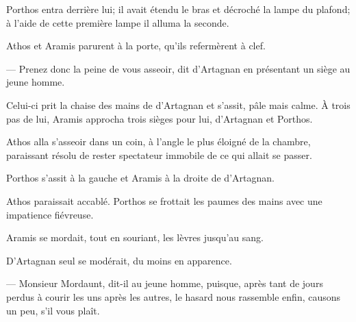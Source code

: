 Porthos entra derrière lui; il avait étendu le bras et décroché la lampe du plafond; à l'aide de cette première lampe il alluma la seconde.

Athos et Aramis parurent à la porte, qu'ils refermèrent à clef.

— Prenez donc la peine de vous asseoir, dit d'Artagnan en présentant un siège au jeune homme.

Celui-ci prit la chaise des mains de d'Artagnan et s'assit, pâle mais calme. À trois pas de lui, Aramis approcha trois sièges pour lui, d'Artagnan et Porthos.

Athos alla s'asseoir dans un coin, à l'angle le plus éloigné de la chambre, paraissant résolu de rester spectateur immobile de ce qui allait se passer.

Porthos s'assit à la gauche et Aramis à la droite de d'Artagnan.

Athos paraissait accablé. Porthos se frottait les paumes des mains avec une impatience fiévreuse.

Aramis se mordait, tout en souriant, les lèvres jusqu'au sang.

D'Artagnan seul se modérait, du moins en apparence.

— Monsieur Mordaunt, dit-il au jeune homme, puisque, après tant de jours perdus à courir les uns après les autres, le hasard nous rassemble enfin, causons un peu, s'il vous plaît.